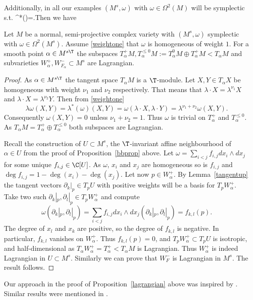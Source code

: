 Additionally, in all our examples  $(M^s,\omega)$ with $\omega\in \Omega^2(M)$ will be  symplectic  s.t. \beq \label{weightone}\lambda^*(\omega)=\lambda\omega.\eeq Then we have
\begin{proposition}
\notready \label{lagrangian} Let $M$ be a normal, semi-projective complex variety with $(M^s,\omega)$ symplectic with $\omega\in \Omega^2(M^s)$. Assume \eqref{weightone} that $\omega$ is homogeneous of weight $1$.  For a smooth point $\alpha\in M^{s\T}$ the subspaces $T^+_\alpha M, T^{\leq 0}_\alpha M:=T^0_\alpha M\oplus T^+_\alpha M <T_\alpha M$ and subvarieties $W^+_\alpha,W^-_{F_\alpha}\subset M^s$ are Lagrangian.
\end{proposition}
\begin{proof} As $\alpha\in M^{s\T}$ the tangent space $T_\alpha M$ is a $\T$-module. Let $X,Y\in T_\alpha X$ be homogeneous  with weight $\nu_1$ and $\nu_2$ respectively. That means that $\lambda\cdot X=\lambda^{\nu_1} X$ and $\lambda\cdot X=\lambda^{\nu_2} Y$. Then from \eqref{weightone} $$\lambda\omega(X,Y)=\lambda^*(\omega)(X,Y)=\omega(\lambda\cdot X,\lambda\cdot Y)=\lambda^{\nu_1+\nu_2}\omega(X,Y).$$ Consequently $\omega(X,Y)=0$ unless $\nu_1+\nu_2=1$. Thus $\omega$ is trivial on $T^+_\alpha$ and $T^{\leq 0}_\alpha$. As $T_\alpha M=T^+_\alpha\oplus T^{\leq 0}_\alpha$ both subspaces are Lagrangian.

	Recall the construction of $U\subset M^s$, the $\T$-invariant affine neighbourhood of $\alpha\in U$ from the proof of Proposition~\ref{bbprop} above.  Let $\omega=\sum_{i<j} f_{i,j} dx_i\wedge dx_j$ for some unique $f_{i,j}\in \C[U]$. As $\omega$, $x_i$ and $x_j$ are homogeneous so is $f_{i,j}$ and $\deg{f_{i,j}}=1-\deg(x_i)-\deg(x_j)$. Let now $p\in W^+_\alpha $. By Lemma~\ref{tangentup} the tangent vectors $\partial_k|_p\in T_p U$ with positive weights will be a basis for $T_p W^+_\alpha$. Take two such $\partial_k|_p, \partial_l|_p\in T_pW^+_\alpha$ and compute $$\omega(\partial_k|_p,\partial_l|_p)=\sum_{i<j} f_{i,j} dx_i\wedge dx_j(\partial_k|_p,\partial_l|_p)=f_{k,l}(p).$$
	The degree of $x_l$ and $x_k$ are positive, so the degree of $f_{k,l}$ is negative. In particular, $f_{k,l}$ vanishes on $W^+_\alpha$. Thus $f_{k,l}(p)=0$, and $T_pW^+_\alpha\subset T_p U$ is isotropic, and half-dimensional as $T_\alpha W^+_\alpha=T_\alpha^+<T_\alpha M$ is Lagrangian. Thus $W^+_\alpha$ is indeed Lagrangian in $U\subset M^s$. Similarly we can prove that $W^-_F$ is Lagrangian in $M^s$. The result follows.\end{proof}
\begin{remark}
\notready Our approach in the  proof of Proposition~\ref{lagrangian} above was inspired by \cite[\S 2.2]{bellamy-etal}. Similar results were mentioned in \cite[Proposition 7.1]{nakajima}.
\end{remark}
